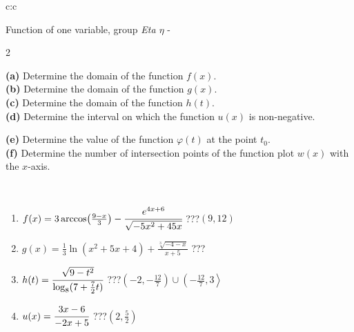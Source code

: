 \documentclass[10pt]{report}
\begin{document}
\begin{tabular}{c:c}
\begin{minipage}[c][104.5mm][t]{0.5\linewidth}
\begin{center}
\vspace{7mm}
{\huge Function of one variable, group \textit{Eta $\eta$} -}\\[5mm]
\begin{minipage}{0.95\linewidth}
\begin{center}
{\small \begin{multicols}{2} \raggedright
\textbf{(a)} Determine the domain of the function \(f(x)\). \\[1mm]
\textbf{(b)} Determine the domain of the function \(g(x)\). \\[1mm]
\textbf{(c)} Determine the domain of the function \(h(t)\). \\[1mm]
\textbf{(d)} Determine the interval on which the function \(u(x)\) is non-negative. \par \columnbreak
\textbf{(e)} Determine the value of the function \(\varphi(t)\) at the point \(t_0\). \\[1mm]
\textbf{(f)} Determine the number of intersection points of the function plot \(w(x)\) with the \(x\)-axis. \\[1mm]
\end{multicols}
}
\end{center}
\end{minipage}
\\[4mm]
\begin{minipage}{0.79\linewidth}
\begin{center}
\begin{varwidth}{\linewidth}
\begin{enumerate}
\small
\item $f(x) = 3\arccos\!\left( \frac{9-x}{3} \right) - \cfrac{e^{4x+6}}{\sqrt{-5x^2+45x}}$\quad \dotfill\; ???\;\dotfill \quad $\left(9 , 12\right)$
\item $g(x) = \frac{1}{3} \ln{\!(x^2+5x+4)}+\frac{\sqrt[3]{-4-x}}{x+5}$\quad \dotfill\; ???\;\dotfill {}
\item $h(t) = \cfrac{\sqrt{9-t^2}}{\log_8(7+\frac{7}{2}t)}$\quad \dotfill\; ???\;\dotfill \quad $\left(-2 , -\frac{12}{7}\right)\cup\left(-\frac{12}{7} , 3\right\rangle$
\item $u(x) = \cfrac{3x-6}{-2x+5}$\quad \dotfill\; ???\;\dotfill \quad $\left(2 , \frac{5}{2}\right)$

\end{enumerate}
\end{varwidth}
\end{center}
\end{minipage}
\end{center}
\end{minipage}
\end{tabular}
\end{document}
